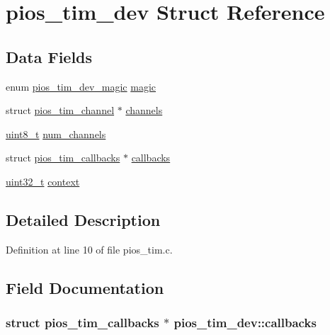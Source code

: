 \hypertarget{structpios__tim__dev}{\section{pios\-\_\-tim\-\_\-dev Struct Reference}
\label{structpios__tim__dev}
}
\subsection*{Data Fields}
\begin{DoxyCompactItemize}
\item 
enum \hyperlink{_s_t_m32_f10x_2pios__tim_8c_a7d425167804fd43bc76fe29c11386a6c}{pios\-\_\-tim\-\_\-dev\-\_\-magic} \hyperlink{structpios__tim__dev_a3656bfa8d4df8ae08ce3c330edc916f9}{magic}
\item 
struct \hyperlink{structpios__tim__channel}{pios\-\_\-tim\-\_\-channel} $\ast$ \hyperlink{structpios__tim__dev_aa8efb40f5c838a19554da434d2eddf40}{channels}
\item 
\hyperlink{stdint_8h_aba7bc1797add20fe3efdf37ced1182c5}{uint8\-\_\-t} \hyperlink{structpios__tim__dev_a2b129aa6d78b9ba69ff095d8a9c53356}{num\-\_\-channels}
\item 
struct \hyperlink{structpios__tim__callbacks}{pios\-\_\-tim\-\_\-callbacks} $\ast$ \hyperlink{structpios__tim__dev_a1c0871bbdb99b41f2cf6bfa91c375d92}{callbacks}
\item 
\hyperlink{stdint_8h_a435d1572bf3f880d55459d9805097f62}{uint32\-\_\-t} \hyperlink{structpios__tim__dev_aa2ce9a6edd8c06b75330b994f67c95b8}{context}
\end{DoxyCompactItemize}


\subsection{Detailed Description}


Definition at line 10 of file pios\-\_\-tim.\-c.



\subsection{Field Documentation}
\hypertarget{structpios__tim__dev_a1c0871bbdb99b41f2cf6bfa91c375d92}{
\subsubsection[{callbacks}]{\setlength{\rightskip}{0pt plus 5cm}struct {\bf pios\-\_\-tim\-\_\-callbacks} $\ast$ pios\-\_\-tim\-\_\-dev\-::callbacks}}\label{structpios__tim__dev_a1c0871bbdb99b41f2cf6bfa91c375d92}


